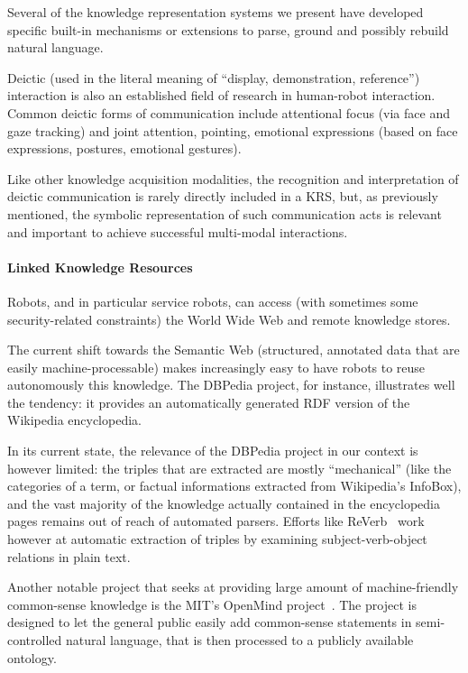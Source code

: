 Several of the knowledge representation systems we present have developed
specific built-in mechanisms or extensions to parse, ground and possibly
rebuild natural language.

Deictic (used in the literal meaning of ``display, demonstration, reference'')
interaction is also an established field of research in human-robot
interaction. Common deictic forms of communication include attentional focus
(via face and gaze tracking) and joint attention, pointing, emotional
expressions (based on face expressions, postures, emotional gestures).

Like other knowledge acquisition modalities, the recognition and interpretation
of deictic communication is rarely directly included in a KRS, but, as
previously mentioned, the symbolic representation of such communication acts is
relevant and important to achieve successful multi-modal interactions.

\paragraph{Linked Knowledge Resources}
\label{sect|lod}

Robots, and in particular service robots, can access (with sometimes some
security-related constraints) the World Wide Web and remote knowledge stores.

The current shift towards the Semantic Web (\ie structured, annotated data that
are easily machine-processable) makes increasingly easy to have robots to reuse
autonomously this knowledge. The DBPedia project, for instance, illustrates
well the tendency: it provides an automatically generated RDF version of the
Wikipedia encyclopedia.

In its current state, the relevance of the DBPedia project in our context is
however limited: the triples that are extracted are mostly ``mechanical'' (like
the categories of a term, or factual informations extracted from Wikipedia's
InfoBox), and the vast majority of the knowledge actually contained in the
encyclopedia pages remains out of reach of automated parsers. Efforts like {\sc
ReVerb}~\cite{Fader2011} work however at automatic extraction of triples by
examining subject-verb-object relations in plain text.

Another notable project that seeks at providing large amount of
machine-friendly common-sense knowledge is the MIT's OpenMind
project~\cite{Singh2002}. The project is designed to let the general public
easily add common-sense statements in semi-controlled natural language, that is
then processed to a publicly available ontology.

